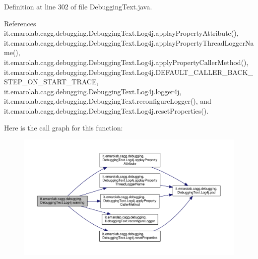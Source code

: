 Definition at line 302 of file Debugging\-Text.\-java.



References it.\-emarolab.\-cagg.\-debugging.\-Debugging\-Text.\-Log4j.\-applay\-Property\-Attribute(), it.\-emarolab.\-cagg.\-debugging.\-Debugging\-Text.\-Log4j.\-applay\-Property\-Thread\-Logger\-Name(), it.\-emarolab.\-cagg.\-debugging.\-Debugging\-Text.\-Log4j.\-apply\-Property\-Caller\-Method(), it.\-emarolab.\-cagg.\-debugging.\-Debugging\-Text.\-Log4j.\-D\-E\-F\-A\-U\-L\-T\-\_\-\-C\-A\-L\-L\-E\-R\-\_\-\-B\-A\-C\-K\-\_\-\-S\-T\-E\-P\-\_\-\-O\-N\-\_\-\-S\-T\-A\-R\-T\-\_\-\-T\-R\-A\-C\-E, it.\-emarolab.\-cagg.\-debugging.\-Debugging\-Text.\-Log4j.\-logger4j, it.\-emarolab.\-cagg.\-debugging.\-Debugging\-Text.\-reconfigure\-Logger(), and it.\-emarolab.\-cagg.\-debugging.\-Debugging\-Text.\-Log4j.\-reset\-Properties().



Here is the call graph for this function\-:\nopagebreak
\begin{figure}[H]
\begin{center}
\leavevmode
\includegraphics[width=350pt]{classit_1_1emarolab_1_1cagg_1_1debugging_1_1DebuggingText_1_1Log4j_aff7eb11ae8f4745f325808055f596beb_cgraph}
\end{center}
\end{figure}




